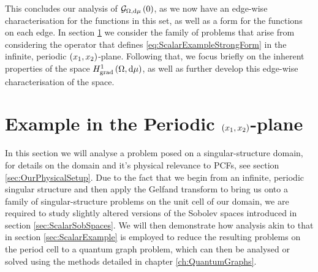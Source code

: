 This concludes our analysis of $\mathcal{G}_{ \Omega, \mathrm{d}\mu}\left( 0 \right)$, as we now have an edge-wise characterisation for the functions in this set, as well as a form for the functions on each edge.
In section \ref{sec:ScalarSystem} we consider the family of problems that arise from considering the operator that defines \eqref{eq:ScalarExampleStrongForm} in the infinite, periodic $\left( x_1,x_2 \right)$-plane.
Following that, we focus briefly on the inherent properties of the space $H^1_\mathrm{grad}\left( \Omega, \mathrm{d}\mu \right)$, as well as further develop this edge-wise characterisation of the space.

\section{Example in the Periodic $\left( x_1,x_2 \right)$-plane} \label{sec:ScalarSystem}
In this section we will analyse a problem posed on a singular-structure domain, for details on the domain and it's physical relevance to PCFs, see section \ref{sec:OurPhysicalSetup}.
Due to the fact that we begin from an infinite, periodic singular structure and then apply the Gelfand transform to bring us onto a family of singular-structure problems on the unit cell of our domain, we are required to study slightly altered versions of the Sobolev spaces introduced in section \ref{sec:ScalarSobSpaces}.
We will then demonstrate how analysis akin to that in section \ref{sec:ScalarExample} is employed to reduce the resulting problems on the period cell to a quantum graph problem, which can then be analysed or solved using the methods detailed in chapter \ref{ch:QuantumGraphs}. \newline

